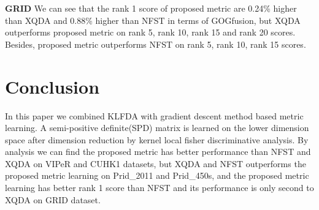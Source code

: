 \documentclass[conference,compsoc]{IEEEtran}
\begin{document}
\textbf{GRID} We can see that the rank 1 score of proposed metric are 0.24\% higher than XQDA and 0.88\% higher than NFST in terms of GOGfusion, but XQDA outperforms proposed metric on rank 5, rank 10, rank 15 and rank 20 scores. Besides, proposed metric outperforms NFST on rank 5, rank 10, rank 15 scores.

\section{Conclusion}
In this paper we combined KLFDA with gradient descent method based metric learning. A semi-positive definite(SPD) matrix is learned on the lower dimension space after dimension reduction by kernel local fisher discriminative analysis. By analysis we can find the proposed metric has better performance than NFST and XQDA on VIPeR and CUHK1 datasets, but XQDA and NFST outperforms the proposed metric learning on Prid\_2011 and Prid\_450s, and the proposed metric learning has better rank 1 score than NFST and its performance is only second to XQDA on GRID dataset.


%
%
%






%
%
%





\end{document}
